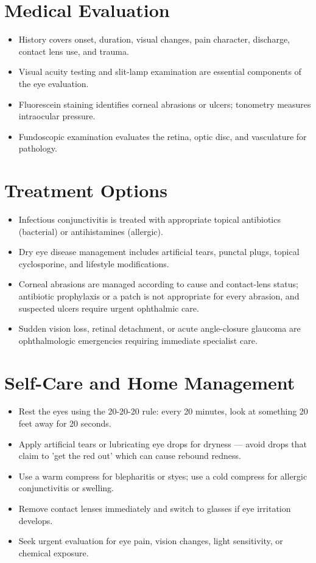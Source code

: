 \section*{Medical Evaluation}
\begin{itemize}
  \item History covers onset, duration, visual changes, pain character, discharge, contact lens use, and trauma.
  \item Visual acuity testing and slit-lamp examination are essential components of the eye evaluation.
  \item Fluorescein staining identifies corneal abrasions or ulcers; tonometry measures intraocular pressure.
  \item Fundoscopic examination evaluates the retina, optic disc, and vasculature for pathology.
\end{itemize}

\section*{Treatment Options}
\begin{itemize}
  \item Infectious conjunctivitis is treated with appropriate topical antibiotics (bacterial) or antihistamines (allergic).
  \item Dry eye disease management includes artificial tears, punctal plugs, topical cyclosporine, and lifestyle modifications.
  \item Corneal abrasions are managed according to cause and contact-lens status; antibiotic prophylaxis or a patch is not appropriate for every abrasion, and suspected ulcers require urgent ophthalmic care.
  \item Sudden vision loss, retinal detachment, or acute angle-closure glaucoma are ophthalmologic emergencies requiring immediate specialist care.
\end{itemize}

\section*{Self-Care and Home Management}
\begin{itemize}
  \item Rest the eyes using the 20-20-20 rule: every 20 minutes, look at something 20 feet away for 20 seconds.
  \item Apply artificial tears or lubricating eye drops for dryness — avoid drops that claim to 'get the red out' which can cause rebound redness.
  \item Use a warm compress for blepharitis or styes; use a cold compress for allergic conjunctivitis or swelling.
  \item Remove contact lenses immediately and switch to glasses if eye irritation develops.
  \item Seek urgent evaluation for eye pain, vision changes, light sensitivity, or chemical exposure.
\end{itemize}

